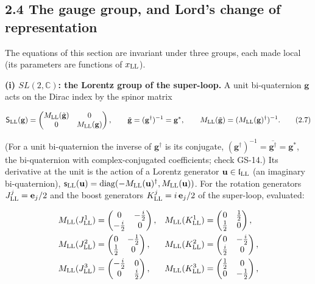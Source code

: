 \documentclass[
  10pt,
]{article}
\begin{document}
\hypertarget{the-gauge-group-and-lords-change-of-representation}{%
\subsection{2.4 The gauge group, and Lord's change of
representation}\label{the-gauge-group-and-lords-change-of-representation}}

The equations of this section are invariant under three groups, each
made local (its parameters are functions of \(x_{\rm LL}\)).

\textbf{(i) \(SL(2,\mathbb C)\): the Lorentz group of the super-loop.} A
unit bi-quaternion \(\mathbf g\) acts on the Dirac index by the spinor
matrix

\[\mathsf S_{\rm LL}(\mathbf g)=\begin{pmatrix}M_{\rm LL}(\tilde{\mathbf g})&0\\0&M_{\rm LL}(\mathbf g)\end{pmatrix},\qquad\tilde{\mathbf g}=(\mathbf g^\dagger)^{-1}=\mathbf g^*,\qquad M_{\rm LL}(\tilde{\mathbf g})=(M_{\rm LL}(\mathbf g)^\dagger)^{-1}.\tag{2.7}\]

(For a unit bi-quaternion the inverse of \(\mathbf g^\dagger\) is its
conjugate,
\((\mathbf g^\dagger)^{-1}=\overline{\mathbf g^\dagger}=\mathbf g^*\),
the bi-quaternion with complex-conjugated coefficients; check GS-14.)
Its derivative at the unit is the action of a Lorentz generator
\(\mathbf u\in\mathfrak l_{\rm LL}\) (an imaginary bi-quaternion),
\(\mathsf s_{\rm LL}(\mathbf u)=\mathrm{diag}(-M_{\rm LL}(\mathbf u)^\dagger,M_{\rm LL}(\mathbf u))\).
For the rotation generators \(J^j_{\rm LL}=\mathbf e_j/2\) and the boost
generators \(K^j_{\rm LL}=i\,\mathbf e_j/2\) of the super-loop,
evaluated:

\[\begin{aligned}M_{\rm LL}(J^1_{\rm LL})&=\begin{pmatrix}0&-\tfrac{i}{2}\\-\tfrac{i}{2}&0\end{pmatrix},&M_{\rm LL}(K^1_{\rm LL})&=\begin{pmatrix}0&\tfrac{1}{2}\\\tfrac{1}{2}&0\end{pmatrix},\\ M_{\rm LL}(J^2_{\rm LL})&=\begin{pmatrix}0&-\tfrac{1}{2}\\\tfrac{1}{2}&0\end{pmatrix},&M_{\rm LL}(K^2_{\rm LL})&=\begin{pmatrix}0&-\tfrac{i}{2}\\\tfrac{i}{2}&0\end{pmatrix},\\ M_{\rm LL}(J^3_{\rm LL})&=\begin{pmatrix}-\tfrac{i}{2}&0\\0&\tfrac{i}{2}\end{pmatrix},&M_{\rm LL}(K^3_{\rm LL})&=\begin{pmatrix}\tfrac{1}{2}&0\\0&-\tfrac{1}{2}\end{pmatrix},\end{aligned}\]
\end{document}
